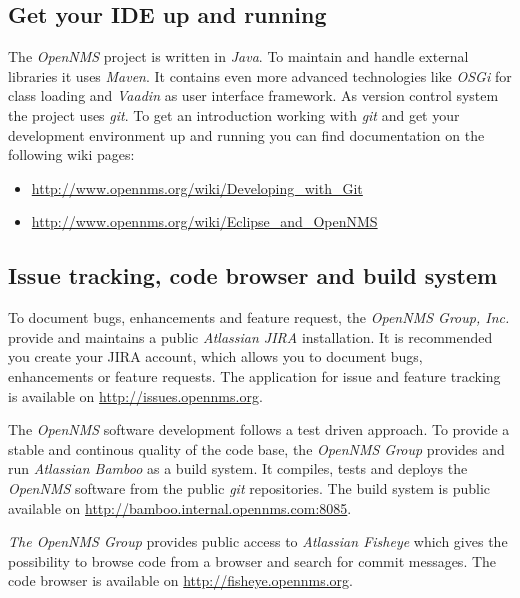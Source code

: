 \subsection*{Get your IDE up and running}
The \emph{OpenNMS} project is written in \emph{Java}. To maintain and handle external libraries it uses \emph{Maven}. It contains even more advanced technologies like \emph{OSGi} for class loading and \emph{Vaadin} as user interface framework. As version control system the project uses \emph{git}. To get an introduction working with \emph{git} and get your development environment up and running you can find documentation on the following wiki pages:
\begin{itemize}
  \item \url{http://www.opennms.org/wiki/Developing_with_Git}
  \item \url{http://www.opennms.org/wiki/Eclipse_and_OpenNMS}
\end{itemize}

\subsection*{Issue tracking, code browser and build system}
To document bugs, enhancements and feature request, the \emph{OpenNMS Group, Inc.} provide and maintains a public \emph{Atlassian JIRA} installation. It is recommended you create your JIRA account, which allows you to document bugs, enhancements or feature requests. The application for issue and feature tracking is available on \url{http://issues.opennms.org}.

The \emph{OpenNMS} software development follows a test driven approach. To provide a stable and continous quality of the code base, the \emph{OpenNMS Group} provides and run \emph{Atlassian Bamboo} as a build system. It compiles, tests and deploys the \emph{OpenNMS} software from the public \emph{git} repositories. The build system is public available on \url{http://bamboo.internal.opennms.com:8085}.

\emph{The OpenNMS Group} provides public access to \emph{Atlassian Fisheye} which gives the possibility to browse code from a browser and search for commit messages. The code browser is available on \url{http://fisheye.opennms.org}.